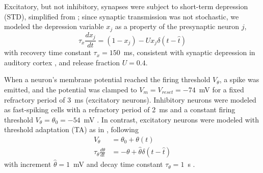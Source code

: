 \documentclass[9pt,lineno,onehalfspacing]{elife}
\begin{document}
Excitatory, but not inhibitory, synapses were subject to short-term depression (STD), simplified from \cite{Tsodyks1997-qt}; since synaptic transmission was not stochastic, we modeled the depression variable $x_j$ as a property of the presynaptic neuron $j$,
\begin{equation}
    \tau_x \frac{dx_j}{dt} = (1-x_j) - U x_j \delta(t - \hat{t}) \label{eq:xsyn}
\end{equation}
with recovery time constant $\tau_x = 150$~ms, consistent with synaptic depression in auditory cortex \citep{David2013-cw,Pennington2020-ua}, and release fraction $U = 0.4$.

When a neuron's membrane potential reached the firing threshold $V_\theta$, a spike was emitted, and the potential was clamped to $V_m = V_{reset} = -74$~mV for a fixed refractory period of 3~ms (excitatory neurons). Inhibitory neurons were modeled as fast-spiking cells with a refractory period of 2~ms and a constant firing threshold $V_\theta = \theta_0 = -54$~mV \citep{Mensi2012-au}. In contrast, excitatory neurons were modeled with threshold adaptation (TA) as in \cite{Teeter2018-iz}, following
\begin{align}
    V_\theta &= \theta_0 + \theta(t) \nonumber \\
    \tau_{\theta} \frac{d\theta}{dt} &= -\theta + \hat{\theta} \delta(t - \hat{t}) \label{eq:TA}
\end{align}
with increment $\hat{\theta} = 1$~mV and decay time constant $\tau_{\theta} = 1$~s \citep{Schwindt1989-lv, Fleidervish1996-ly, Sanchez-Vives2000-rv, La_Camera2006-dz}.
\end{document}
